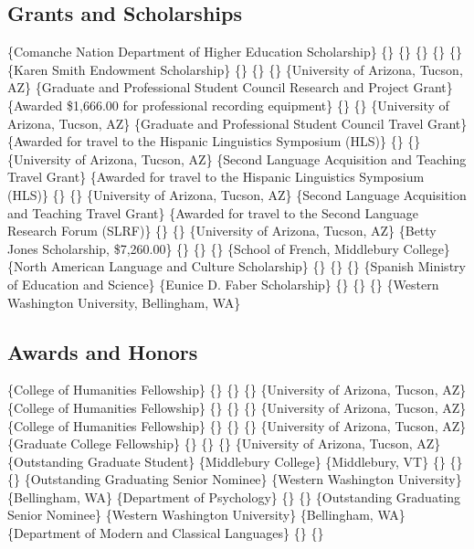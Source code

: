 \documentclass[11pt,letterpaper]{moderncv}
\begin{document}
\vspace{-0.2in}

\subsection{Grants and Scholarships}


\{Comanche Nation Department of Higher Education Scholarship\} \{\} \{\}
\{\} \{\} \{\}  \{Karen Smith Endowment Scholarship\} \{\}
\{\} \{\} \{University of Arizona, Tucson, AZ\} 
\{Graduate and Professional Student Council Research and Project Grant\}
\{\newline Awarded \$1,666.00 for professional recording equipment\}
\{\} \{\} \{University of Arizona, Tucson, AZ\} 
\{Graduate and Professional Student Council Travel Grant\}
\{\newline Awarded for travel to the Hispanic Linguistics Symposium
(HLS)\} \{\} \{\} \{University of Arizona, Tucson, AZ\} 
\{Second Language Acquisition and Teaching Travel Grant\}
\{\newline Awarded for travel to the Hispanic Linguistics Symposium
(HLS)\} \{\} \{\} \{University of Arizona, Tucson, AZ\} 
\{Second Language Acquisition and Teaching Travel Grant\}
\{\newline Awarded for travel to the Second Language Research Forum
(SLRF)\} \{\} \{\} \{University of Arizona, Tucson, AZ\} 
\{Betty Jones Scholarship, \$7,260.00\} \{\} \{\} \{\} \{School of
French, Middlebury College\}  \{North American
Language and Culture Scholarship\} \{\} \{\} \{\} \{Spanish Ministry of
Education and Science\}  \{Eunice D. Faber
Scholarship\} \{\} \{\} \{\} \{Western Washington University,
Bellingham, WA\}

\subsection{Awards and Honors}


\{College of Humanities Fellowship\} \{\} \{\} \{\} \{University of
Arizona, Tucson, AZ\}  \{College of Humanities
Fellowship\} \{\} \{\} \{\} \{University of Arizona, Tucson, AZ\}
 \{College of Humanities Fellowship\} \{\} \{\}
\{\} \{University of Arizona, Tucson, AZ\} 
\{Graduate College Fellowship\} \{\} \{\} \{\} \{University of Arizona,
Tucson, AZ\}  \{Outstanding Graduate Student\}
\{Middlebury College\} \{Middlebury, VT\} \{\} \{\} \{\} 
\{Outstanding Graduating Senior Nominee\} \{Western Washington
University\} \{Bellingham, WA\} \{Department of Psychology\} \{\} \{\}
 \{Outstanding Graduating Senior Nominee\} \{Western
Washington University\} \{Bellingham, WA\} \{Department of Modern and
Classical Languages\} \{\} \{\}
\end{document}
